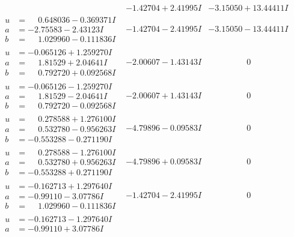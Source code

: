 \documentclass[1p]{elsarticle_modified}
\theoremstyle{definition}
\begin{document}
$$\begin{array}{c|c|c}
 & -1.42704 + 2.41995 I & -3.15050 + 13.44411 I \\ \hline\begin{aligned}
u &= \phantom{-}0.648036 - 0.369371 I \\
a &= -2.75583 - 2.43123 I \\
b &= \phantom{-}1.029960 - 0.111836 I\end{aligned}
 & -1.42704 - 2.41995 I & -3.15050 - 13.44411 I \\ \hline\begin{aligned}
u &= -0.065126 + 1.259270 I \\
a &= \phantom{-}1.81529 + 2.04641 I \\
b &= \phantom{-}0.792720 + 0.092568 I\end{aligned}
 & -2.00607 - 1.43143 I & \phantom{-0.000000 } 0 \\ \hline\begin{aligned}
u &= -0.065126 - 1.259270 I \\
a &= \phantom{-}1.81529 - 2.04641 I \\
b &= \phantom{-}0.792720 - 0.092568 I\end{aligned}
 & -2.00607 + 1.43143 I & \phantom{-0.000000 } 0 \\ \hline\begin{aligned}
u &= \phantom{-}0.278588 + 1.276100 I \\
a &= \phantom{-}0.532780 - 0.956263 I \\
b &= -0.553288 - 0.271190 I\end{aligned}
 & -4.79896 - 0.09583 I & \phantom{-0.000000 } 0 \\ \hline\begin{aligned}
u &= \phantom{-}0.278588 - 1.276100 I \\
a &= \phantom{-}0.532780 + 0.956263 I \\
b &= -0.553288 + 0.271190 I\end{aligned}
 & -4.79896 + 0.09583 I & \phantom{-0.000000 } 0 \\ \hline\begin{aligned}
u &= -0.162713 + 1.297640 I \\
a &= -0.99110 - 3.07786 I \\
b &= \phantom{-}1.029960 - 0.111836 I\end{aligned}
 & -1.42704 - 2.41995 I & \phantom{-0.000000 } 0 \\ \hline\begin{aligned}
u &= -0.162713 - 1.297640 I \\
a &= -0.99110 + 3.07786 I \\

\end{aligned}
\end{array}$$
\end{document}
